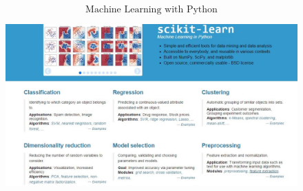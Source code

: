 \documentclass[MASTER.tex]{subfiles}
\begin{document}
 
	
	
	\begin{frame}
		\huge
		\[ \mbox{Machine Learning with Python} \]
	\end{frame}
	
%
%
%
%
\begin{frame}
	\begin{figure}
\centering
\includegraphics[width=1.2\linewidth]{SKLsite}

\end{figure}

\end{frame}
\end{document}
